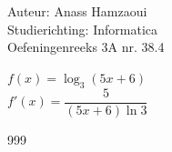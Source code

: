 \documentclass[a4paper]{article}
\begin{document}
  
\noindent \large Auteur: Anass Hamzaoui \\
\noindent \large Studierichting: Informatica\\
\noindent \large Oefeningenreeks 3A nr. 38.4\\

\medskip

\normalsize

$f(x) = \log_{3}(5x+6)$\\

$f'(x) = \dfrac{5}{(5x+6)\ln 3}$\\

\begin{thebibliography}{999}
\end{thebibliography}
\end{document}
